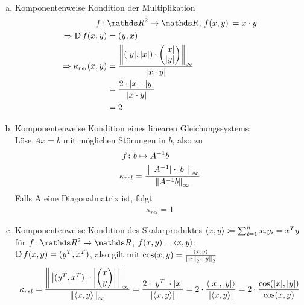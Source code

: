 \begin{Bspe}~
  \begin{enumerate}[a)]
  \item Komponentenweise Kondition der Multiplikation
    \begin{align*}
      f\colon &\R^2 \rightarrow \R, \, f(x,y) \coloneqq x\cdot y \\
      \Rightarrow \D f(x,y) &= (y, x)  \\
      \Rightarrow \kappa_{rel}(x,y) &= \frac{\left\| (|y|, |x|)\cdot \begin{pmatrix}
            |x| \\
            |y|
          \end{pmatrix}\right\|_\infty}
      {|x\cdot y|} \\
              &= \frac{2\cdot|x|\cdot |y|}{|x\cdot y|} \\
              &= 2
    \end{align*}
  \item Komponentenweise Kondition eines linearen Gleichungssystems:\\
    Löse $Ax=b$ mit möglichen Störungen in $b$, also zu
    \begin{align*}
      f\colon & b\mapsto A^{-1}b \\
      \kappa_{rel} & = \frac{\nn[ \, |A^{-1}| \cdot |b|\, ]_\infty}{\nn[A^{-1}b]_\infty}
    \end{align*}
    Falls A eine Diagonalmatrix ist, folgt
    \begin{gather*}
      \kappa_{rel}=1
    \end{gather*}
  \item Komponentenweise Kondition des Skalarproduktes 
    $\scp{x}{y}\coloneqq \sum_{i=1}^{n}x_i y_i = x^Ty$ für
    $f\colon\R^2 \to \R$, $f(x,y) = \scp{x}{y}$:\\
    $\D f(x,y) = (y^T, x^T)$, also gilt mit
    $\cos(x,y) = \frac{\scp{x}{y}}{\nn[x]_2 \cdot \nn[y]_2}$
    \begin{gather*}
      \kappa_{rel}  
      = \frac{\nn[
        \,\left|(y^T, x^T)\right|
        \cdot\left|\begin{pmatrix}x\\y\end{pmatrix}\right|\,
      ]_\infty }
      {\nn[\langle x,y\rangle]_\infty}
      = \frac{2\cdot |y^T|\cdot |x|}{|\langle x,y\rangle|} 
      = 2\cdot \frac{\langle |x|,|y|\rangle}{|\langle x,y\rangle|} 
      = 2 \cdot \frac{\cos(|x|, |y|)}{\cos(x,y)}  
    \end{gather*}

\end{enumerate}
\end{Bspe}
